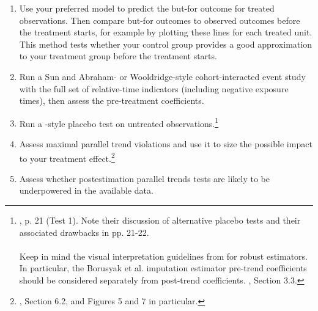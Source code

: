 \documentclass[12pt]{article}
\begin{document}
\begin{enumerate}
\begin{enumerate}
        \item \label{butfor-item} Use your preferred model to predict the but-for outcome for treated observations. Then compare but-for outcomes to observed outcomes before the treatment starts, for example by plotting these lines for each treated unit. This method tests whether your control group provides a good approximation to your treatment group before the treatment starts.
        \item Run a Sun and Abraham- or Wooldridge-style cohort-interacted event study with the full set of relative-time indicators (including negative exposure times), then assess the pre-treatment coefficients.
        \item Run a \citet{borusyak2024revisiting}-style placebo test on untreated observations.\footnote{\citet{borusyak2024revisiting}, p. 21 (Test 1). Note their discussion of alternative placebo tests and their associated drawbacks in pp. 21-22.
        \\\\
        Keep in mind the visual interpretation guidelines from \citet{roth2024a} for robust estimators. In particular, the Borusyak et al. imputation estimator pre-trend coefficients should be considered separately from post-trend coefficients. \citet{roth2024a}, Section 3.3.}
        \item Assess maximal parallel trend violations and use it to size the possible impact to your treatment effect.\footnote{\citet{rambachan2023more}, Section 6.2, and Figures 5 and 7 in particular.}
        \item Assess whether postestimation parallel trends tests are likely to be underpowered in the available data.

\end{enumerate}
\end{enumerate}
\end{document}
